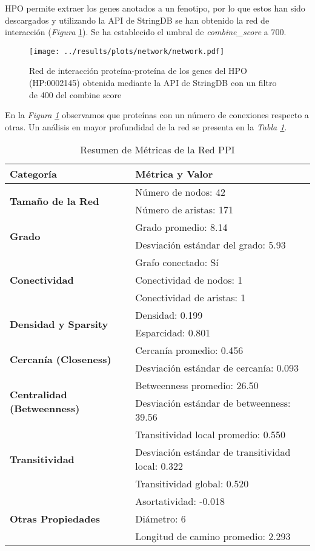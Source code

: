 HPO permite extraer los genes anotados a un fenotipo, por lo que estos han sido descargados y utilizando la API de StringDB se han obtenido la red de interacción (\textit{Figura} \ref{fig:network}).
Se ha establecido el umbral de \textit{combine\_score} a 700.

\begin{figure}[h]
	\centering
	\texttt{[image: ../results/plots/network/network.pdf]}
	\caption{Red de interacción proteína-proteína de los genes del HPO (HP:0002145) obtenida mediante la API de StringDB con un filtro de 400 del combine score}
	\label{fig:network}
\end{figure}

En la \textit{Figura \ref{fig:network}} observamos que proteínas con un número de conexiones respecto a otras. 
Un análisis en mayor profundidad de la red se presenta en la \textit{Tabla \ref{tab:NetworkMetrics}}.


\begin{table}[h!]
	\centering
	\caption{Resumen de Métricas de la Red PPI}
	\label{tab:NetworkMetrics}
	\begin{tabular}{ll}
		\toprule
		\textbf{Categoría} & \textbf{Métrica y Valor} \\
		\midrule
		\multirow{2}{*}{\textbf{Tamaño de la Red}} 
		& Número de nodos: 42 \\
		& Número de aristas: 171 \\
		\midrule
		\multirow{2}{*}{\textbf{Grado}} 
		& Grado promedio: 8.14 \\
		& Desviación estándar del grado: 5.93 \\
		\midrule
		\multirow{3}{*}{\textbf{Conectividad}} 
		& Grafo conectado: Sí \\
		& Conectividad de nodos: 1 \\
		& Conectividad de aristas: 1 \\
		\midrule
		\multirow{2}{*}{\textbf{Densidad y Sparsity}} 
		& Densidad: 0.199 \\
		& Esparcidad: 0.801 \\
		\midrule
		\multirow{2}{*}{\textbf{Cercanía (Closeness)}} 
		& Cercanía promedio: 0.456 \\
		& Desviación estándar de cercanía: 0.093 \\
		\midrule
		\multirow{2}{*}{\textbf{Centralidad (Betweenness)}} 
		& Betweenness promedio: 26.50 \\
		& Desviación estándar de betweenness: 39.56 \\
		\midrule
		\multirow{3}{*}{\textbf{Transitividad}} 
		& Transitividad local promedio: 0.550 \\
		& Desviación estándar de transitividad local: 0.322 \\
		& Transitividad global: 0.520 \\
		\midrule
		\multirow{3}{*}{\textbf{Otras Propiedades}} 
		& Asortatividad: -0.018 \\
		& Diámetro: 6 \\
		& Longitud de camino promedio: 2.293 \\
		\bottomrule
	\end{tabular}
\end{table}

